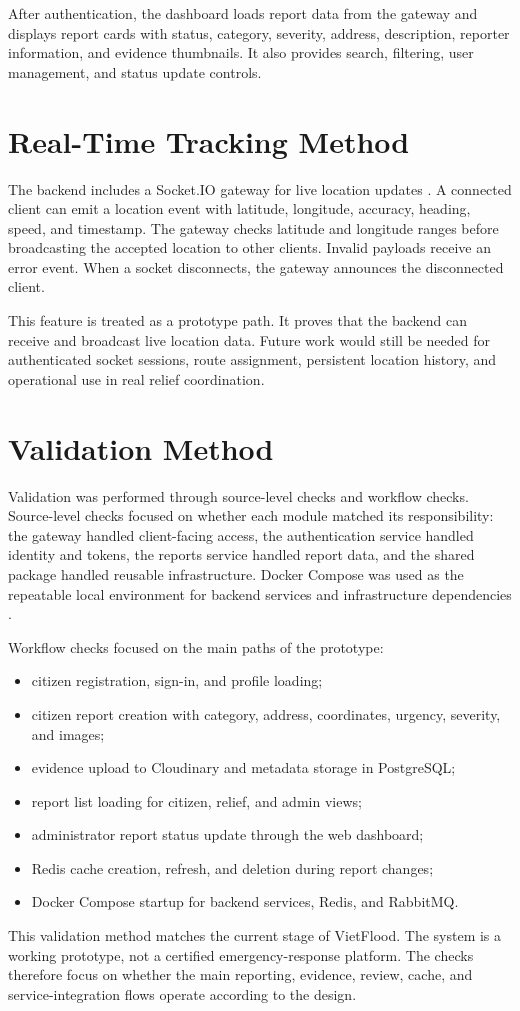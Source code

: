 After authentication, the dashboard loads report data from the gateway and displays report cards with status, category, severity, address, description, reporter information, and evidence thumbnails. It also provides search, filtering, user management, and status update controls.

\section{Real-Time Tracking Method}

The backend includes a Socket.IO gateway for live location updates \cite{socketioDocs}. A connected client can emit a location event with latitude, longitude, accuracy, heading, speed, and timestamp. The gateway checks latitude and longitude ranges before broadcasting the accepted location to other clients. Invalid payloads receive an error event. When a socket disconnects, the gateway announces the disconnected client.

This feature is treated as a prototype path. It proves that the backend can receive and broadcast live location data. Future work would still be needed for authenticated socket sessions, route assignment, persistent location history, and operational use in real relief coordination.

\section{Validation Method}

Validation was performed through source-level checks and workflow checks. Source-level checks focused on whether each module matched its responsibility: the gateway handled client-facing access, the authentication service handled identity and tokens, the reports service handled report data, and the shared package handled reusable infrastructure. Docker Compose was used as the repeatable local environment for backend services and infrastructure dependencies \cite{dockerComposeDocs}.

Workflow checks focused on the main paths of the prototype:

\begin{itemize}
    \item citizen registration, sign-in, and profile loading;
    \item citizen report creation with category, address, coordinates, urgency, severity, and images;
    \item evidence upload to Cloudinary and metadata storage in PostgreSQL;
    \item report list loading for citizen, relief, and admin views;
    \item administrator report status update through the web dashboard;
    \item Redis cache creation, refresh, and deletion during report changes;
    \item Docker Compose startup for backend services, Redis, and RabbitMQ.
\end{itemize}

This validation method matches the current stage of VietFlood. The system is a working prototype, not a certified emergency-response platform. The checks therefore focus on whether the main reporting, evidence, review, cache, and service-integration flows operate according to the design.
